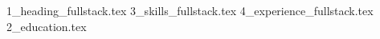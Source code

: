 \documentclass[a4paper, 11pt]{article}
\newcommand*{\sectiondir}{sections/}
\begin{document}
{1_heading_fullstack.tex}
{3_skills_fullstack.tex}
{4_experience_fullstack.tex}
{2_education.tex}
\end{document}

